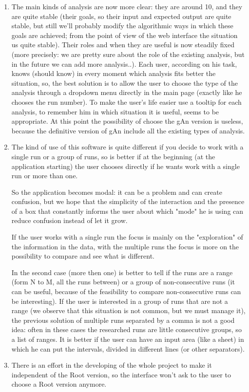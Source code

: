 \begin{enumerate}
\item 
The main kinds of analysis are now more clear: they are around 10, and they are     quite stable (their goals, so their input and expected output are quite stable, but still we'll probably modify the algorithmic ways in which these goals are achieved; from the point of view of the web interface the situation us quite stable). Their roles and when they are useful is now steadily fixed (more precisely: we are pretty sure about the role of the existing analysis, but in the future we can add more analysis..). Each user, according on his task, knows (should know) in every moment which analysis fits better the situation, so, the best solution is to allow the user to choose the type of the analysis through a dropdown menu directly in the main page (exactly like he chooses the run number). To make the user's life easier use a tooltip for each analysis, to remember him in which situation it is useful, seems to be appropriate. At this point the possibility of choose the gAn version is useless, because the definitive version of gAn include all the existing types of analysis. 

\item 
The kind of use of this software is quite different if you decide to work with a single run or a group of runs, so is better if at the beginning (at the application starting) the user chooses directly if he wants work with a single run or more than one. 

So the application becomes modal: it can be a problem and can create confusion, but we hope that the simplicity of the interaction and the presence of a box that constantly informs the user about which "mode" he is using can reduce confusion instead of let it grow.  

If the user works with a single run the focus is mainly on the "exploration" of the information in the data, with the multiple runs the focus is more on the possibility to compare and see what is different.

In the second case (more then one) is better to tell if the runs are a range (form N to M, all the runs between) or a group of non-consecutive runs (it can be useful, because of the feasibility to compare non-consecutive runs can be interesting). If the user is interested in a group of runs that are not a range (we observe that this situation is not common, but we must manage it), the previous solution of multiple runs separated by a comma is not a good idea: often in these cases the researched runs are little consecutive groups, so a list of ranges. It is better if the user can have an input area (like a sheet) in which he can put the intervals, divided in different lines (or other separators).

\item
There is an effort in the developing of the whole project to make it independent of the Root version, so the interface won't ask to the user to choose a Root version anymore. 

\end{enumerate}
 
